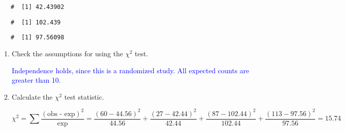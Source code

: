 \documentclass[letterpaper,12pt,twoside,]{pinp}
\begin{document}
\begin{enumerate}
  \begin{ShadedResult}
   \begin{verbatim}
   #  [1] 42.43902
   \end{verbatim}
   \end{ShadedResult}

\begin{Shaded}
\begin{Highlighting}[]
\NormalTok{ =}\StringTok{ }\OperatorTok{*}\StringTok{ }\OperatorTok{/}
\end{Highlighting}
\end{Shaded}

  \begin{ShadedResult}
   \begin{verbatim}
   #  [1] 102.439
   \end{verbatim}
   \end{ShadedResult}

\begin{Shaded}
\begin{Highlighting}[]
\NormalTok{ =}\StringTok{ }\OperatorTok{*}\StringTok{ }\OperatorTok{/}
\end{Highlighting}
\end{Shaded}

  \begin{ShadedResult}
   \begin{verbatim}
   #  [1] 97.56098
   \end{verbatim}
   \end{ShadedResult}

  \begin{enumerate}
  \def\labelenumii{\alph{enumii})}
  \setcounter{enumii}{2}
  \item
    Check the assumptions for using the \(\chi^2\) test.

    \textcolor{blue}{Independence holds, since this is a randomized study. All expected counts are greater than 10.}
  \item
    Calculate the \(\chi^2\) test statistic.

    \color{blue}

    \[\chi^2 = \sum \dfrac{(\text{obs - exp})^2}{\text{exp}} = \dfrac{(60-44.56)^2}{44.56} + \dfrac{(27-42.44)^2}{42.44} +  \dfrac{(87-102.44)^2}{102.44} + \dfrac{(113 - 97.56)^2}{97.56} = 15.74\]


\end{enumerate}
\end{enumerate}
\end{document}
